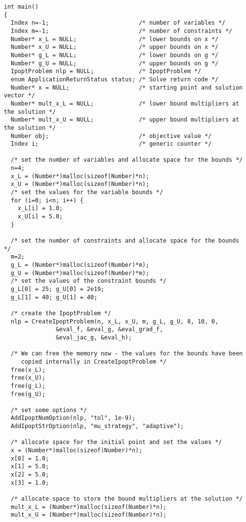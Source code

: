 \documentclass[10pt]{article}
\begin{document}
\begin{verbatim}
int main()
{
  Index n=-1;                          /* number of variables */
  Index m=-1;                          /* number of constraints */
  Number* x_L = NULL;                  /* lower bounds on x */
  Number* x_U = NULL;                  /* upper bounds on x */
  Number* g_L = NULL;                  /* lower bounds on g */
  Number* g_U = NULL;                  /* upper bounds on g */
  IpoptProblem nlp = NULL;             /* IpoptProblem */
  enum ApplicationReturnStatus status; /* Solve return code */
  Number* x = NULL;                    /* starting point and solution vector */
  Number* mult_x_L = NULL;             /* lower bound multipliers at the solution */
  Number* mult_x_U = NULL;             /* upper bound multipliers at the solution */
  Number obj;                          /* objective value */
  Index i;                             /* generic counter */
  
  /* set the number of variables and allocate space for the bounds */
  n=4;
  x_L = (Number*)malloc(sizeof(Number)*n);
  x_U = (Number*)malloc(sizeof(Number)*n);
  /* set the values for the variable bounds */
  for (i=0; i<n; i++) {
    x_L[i] = 1.0;
    x_U[i] = 5.0;
  }

  /* set the number of constraints and allocate space for the bounds */
  m=2;
  g_L = (Number*)malloc(sizeof(Number)*m);
  g_U = (Number*)malloc(sizeof(Number)*m);
  /* set the values of the constraint bounds */
  g_L[0] = 25; g_U[0] = 2e19;
  g_L[1] = 40; g_U[1] = 40;

  /* create the IpoptProblem */
  nlp = CreateIpoptProblem(n, x_L, x_U, m, g_L, g_U, 8, 10, 0, 
			   &eval_f, &eval_g, &eval_grad_f, 
			   &eval_jac_g, &eval_h);
  
  /* We can free the memory now - the values for the bounds have been
     copied internally in CreateIpoptProblem */
  free(x_L);
  free(x_U);
  free(g_L);
  free(g_U);

  /* set some options */
  AddIpoptNumOption(nlp, "tol", 1e-9);
  AddIpoptStrOption(nlp, "mu_strategy", "adaptive");

  /* allocate space for the initial point and set the values */
  x = (Number*)malloc(sizeof(Number)*n);
  x[0] = 1.0;
  x[1] = 5.0;
  x[2] = 5.0;
  x[3] = 1.0;

  /* allocate space to store the bound multipliers at the solution */
  mult_x_L = (Number*)malloc(sizeof(Number)*n);
  mult_x_U = (Number*)malloc(sizeof(Number)*n);


\end{verbatim}
\end{document}
